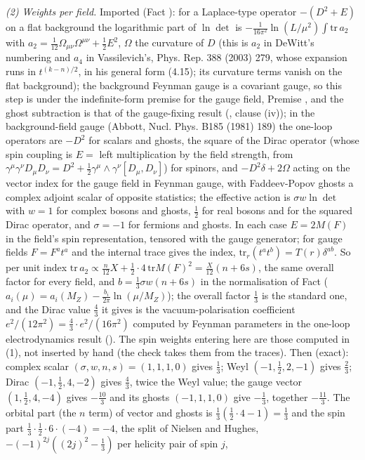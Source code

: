 \emph{(2) Weights per field.} Imported (Fact ): for a Laplace-type operator $-(D^{2} + E)$ on a flat background the logarithmic part of $\ln\det$ is $-\tfrac{1}{16\pi^{2}}\ln(L/\mu^{2})\int\mathrm{tr}\,a_{2}$ with $a_{2} = \tfrac{1}{12}\Omega_{\mu\nu}\Omega^{\mu\nu} + \tfrac12E^{2}$, $\Omega$ the curvature of $D$ (this is $a_{2}$ in DeWitt's numbering and $a_{4}$ in Vassilevich's, Phys. Rep. 388 (2003) 279, whose expansion runs in $t^{(k-n)/2}$, in his general form (4.15); its curvature terms vanish on the flat background); the background Feynman gauge is a covariant gauge, so this step is under the indefinite-form premise for the gauge field, Premise , and the ghost subtraction is that of the gauge-fixing result (, clause (iv)); in the background-field gauge (Abbott, Nucl. Phys. B185 (1981) 189) the one-loop operators are $-D^{2}$ for scalars and ghosts, the square of the Dirac operator (whose spin coupling is $E = $ left multiplication by the field strength, from $\gamma^{\mu}\gamma^{\nu}D_{\mu}D_{\nu} = D^{2} + \tfrac12\gamma^{\mu}\wedge\gamma^{\nu}[D_{\mu}, D_{\nu}]$) for spinors, and $-D^{2}\delta + 2\Omega$ acting on the vector index for the gauge field in Feynman gauge, with Faddeev-Popov ghosts a complex adjoint scalar of opposite statistics; the effective action is $\sigma w\ln\det$ with $w = 1$ for complex bosons and ghosts, $\tfrac12$ for real bosons and for the squared Dirac operator, and $\sigma = -1$ for fermions and ghosts. In each case $E = 2M(F)$ in the field's spin representation, tensored with the gauge generator; for gauge fields $F = F^{a}t^{a}$ and the internal trace gives the index, $\mathrm{tr}_{r}(t^{a}t^{b}) = T(r)\delta^{ab}$. So per unit index $\mathrm{tr}\,a_{2} \propto \tfrac{n}{12}X + \tfrac12\cdot 4\,\mathrm{tr}M(F)^{2} = \tfrac{X}{12}(n + 6s)$, the same overall factor for every field, and $b = \tfrac13\sigma w(n + 6s)$ in the normalisation of Fact  ($a_{i}(\mu) = a_{i}(M_{Z}) - \tfrac{b_{i}}{2\pi}\ln(\mu/M_{Z})$); the overall factor $\tfrac13$ is the standard one, and the Dirac value $\tfrac43$ it gives is the vacuum-polarisation coefficient $e^{2}/(12\pi^{2}) = \tfrac43\cdot e^{2}/(16\pi^{2})$ computed by Feynman parameters in the one-loop electrodynamics result (). The spin weights entering here are those computed in (1), not inserted by hand (the check takes them from the traces). Then (exact): complex scalar $(\sigma, w, n, s) = (1, 1, 1, 0)$ gives $\tfrac13$; Weyl $(-1, \tfrac12, 2, -1)$ gives $\tfrac23$; Dirac $(-1, \tfrac12, 4, -2)$ gives $\tfrac43$, twice the Weyl value; the gauge vector $(1, \tfrac12, 4, -4)$ gives $-\tfrac{10}{3}$ and its ghosts $(-1, 1, 1, 0)$ give $-\tfrac13$, together $-\tfrac{11}{3}$. The orbital part (the $n$ term) of vector and ghosts is $\tfrac13(\tfrac12\cdot4 - 1) = \tfrac13$ and the spin part $\tfrac13\cdot\tfrac12\cdot6\cdot(-4) = -4$, the split of Nielsen and Hughes, $-(-1)^{2j}((2j)^{2} - \tfrac13)$ per helicity pair of spin $j$, 
